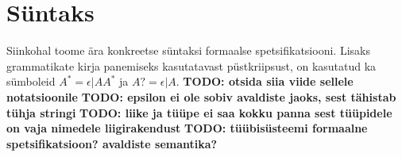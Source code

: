 \documentclass[12pt]{article}
\newcommand\peatykk[1]{
  \clearpage
  \section{#1}}
\newcommand\markus[1]{\textcolor{roheline}{\textbf{#1}}}
\begin{document}
  \peatykk{Süntaks}\label{syntaks}
\begin{comment}
  data Brnch_0 = Brnch_0 Name [Name] Name [(Name, Type_0)] deriving Show
  data Data_br_0 = Branching_data_0 Name [Kind_0] [(Name, Kind_0)] [Brnch_0] | Plain_data_0 [(Name, Kind_0)] Data_branch_0
  data Data_branch_0 = Algebraic_data_0 [Form_0]
  data Def_0 =
    Basic_def_0 Name [(Name, Kind_0)] [Constraint_0] [(Pattern_1, Type_0)] Type_0 Expression_0 |
    Instance_def_0 Location_0 Name Name [Kind_0] [Pattern_1] [Constraint_0] [(Name, ([Pattern_1], Expression_0))]
  data Expression_branch_0 =
    Application_expression_0 Expression_0 Expression_0
  data Match_Algebraic_0 = Match_Algebraic_0 Name [Pattern_1] Expression_0 deriving Show
  data Match_char_0 = Match_char_0 Char Expression_0 deriving Show
  data Match_Int_0 = Match_Int_0 Integer Expression_0 deriving Show
  data Matches_0 =
    Matches_Algebraic_0 [Match_Algebraic_0] (Maybe (Location_0, Expression_0)) |
    Matches_char_0 [Match_char_0] Expression_0 |
    Matches_Int_0 [Match_Int_0] Expression_0
      deriving Show
\end{comment}
    Siinkohal toome ära konkreetse süntaksi formaalse spetsifikatsiooni. Lisaks grammatikate kirja panemiseks kasutatavast püstkriipsust, on kasutatud ka sümboleid $A^*=\epsilon|AA^*$ ja $A?=\epsilon|A$. \markus{TODO: otsida siia viide sellele notatsioonile} \markus{TODO: epsilon ei ole sobiv avaldiste jaoks, sest tähistab tühja stringi} \markus{TODO: liike ja tüüpe ei saa kokku panna sest tüüpidele on vaja nimedele liigirakendust} \markus{TODO: tüübisüsteemi formaalne spetsifikatsioon? avaldiste semantika?}
\end{document}
